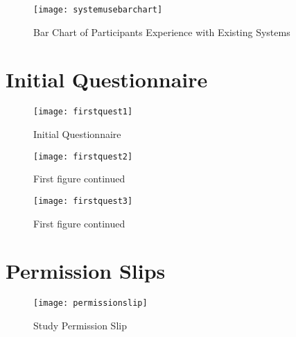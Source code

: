 \begin{figure}[H]
\centering
\texttt{[image: systemusebarchart]}
\caption{Bar Chart of Participants Experience with Existing Systems \label{systemusebarchart}}
\end{figure}

\section{Initial Questionnaire} \label{appendixquestionnaires}

\begin{figure}[H]
  \centering
  \texttt{[image: firstquest1]}
  \caption{Initial Questionnaire \label{initialquestionnaire}}
\end{figure}

\begin{figure}[H]
  \ContinuedFloat
  \captionsetup{list=off,format=cont}
  \centering
  \texttt{[image: firstquest2]}
  \caption{First figure continued}
\end{figure}

\begin{figure}[H]
  \ContinuedFloat
  \captionsetup{list=off,format=cont}
  \centering
  \texttt{[image: firstquest3]}
  \caption{First figure continued}
\end{figure}

\section{Permission Slips} \label{appendixpermission}
\begin{figure}[H]
  \centering
  \texttt{[image: permissionslip]}
  \caption{Study Permission Slip \label{permissionslip}}
\end{figure}



